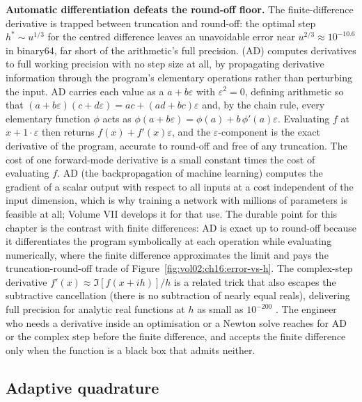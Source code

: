 \begin{mastery}
\textbf{Automatic differentiation defeats the round-off floor.} The
finite-difference derivative is trapped between truncation and round-off:
the optimal step $h^{*} \sim u^{1/3}$ for the centred difference leaves an
unavoidable error near $u^{2/3} \approx 10^{-10.6}$ in binary64, far short
of the arithmetic's full precision. 
(AD) computes derivatives to full working precision with no step size at
all, by propagating derivative information through the program's elementary
operations rather than perturbing the input.  AD
carries each value as a  $a + b\varepsilon$ with
$\varepsilon^{2} = 0$, defining arithmetic so that $(a + b\varepsilon)(c +
d\varepsilon) = ac + (ad + bc)\varepsilon$ and, by the chain rule, every
elementary function $\phi$ acts as $\phi(a + b\varepsilon) = \phi(a) +
b\,\phi'(a)\varepsilon$. Evaluating $f$ at $x + 1\cdot\varepsilon$ then
returns $f(x) + f'(x)\varepsilon$, and the $\varepsilon$-component is the
exact derivative of the program, accurate to round-off and free of any
truncation. The cost of one forward-mode derivative is a small constant
times the cost of evaluating $f$.  AD (the
backpropagation of machine learning) computes the gradient of a scalar
output with respect to all inputs at a cost independent of the input
dimension, which is why training a network with millions of parameters is
feasible at all; Volume VII develops it for that use. The durable point
for this chapter is the contrast with finite differences: AD is exact up
to round-off because it differentiates the program symbolically at each
operation while evaluating numerically, where the finite difference
approximates the limit and pays the truncation-round-off trade of
Figure~\ref{fig:vol02:ch16:error-vs-h}. The complex-step derivative
$f'(x) \approx \Im[f(x + i h)]/h$ is a related trick that also escapes the
subtractive cancellation (there is no subtraction of nearly equal reals),
delivering full precision for analytic real functions at $h$ as small as
$10^{-200}$ \cite[\S 5.7]{text:higham-numerical}. The engineer who needs a
derivative inside an optimisation or a Newton solve reaches for AD or the
complex step before the finite difference, and accepts the finite
difference only when the function is a black box that admits neither.
\end{mastery}

\subsection{Adaptive quadrature}

